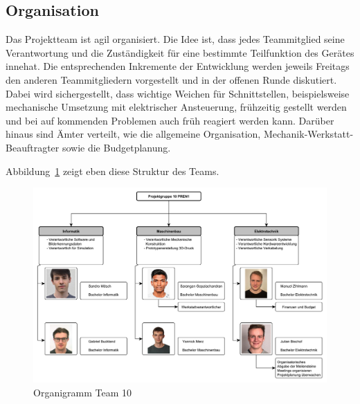 \documentclass[main.tex]{subfiles} %
\begin{document}

\subsection{Organisation}

Das Projektteam ist agil organisiert. Die Idee ist, dass jedes Teammitglied
seine Verantwortung und die Zuständigkeit für eine bestimmte Teilfunktion des
Gerätes innehat. Die entsprechenden Inkremente der Entwicklung werden jeweils
Freitags den anderen Teammitgliedern vorgestellt und in der offenen Runde
diskutiert. Dabei wird sichergestellt, dass wichtige Weichen für
Schnittstellen, beispielsweise mechanische Umsetzung mit elektrischer
Ansteuerung, frühzeitig gestellt werden und bei auf kommenden Problemen auch
früh reagiert werden kann. Darüber hinaus sind Ämter verteilt, wie die
allgemeine Organisation, Mechanik-Werkstatt-Beauftragter sowie die
Budgetplanung.

Abbildung~\ref{fig:Organigramm} zeigt eben diese Struktur des Teams.

\begin{figure}[h!]
    \centering
    \includegraphics[page=1, width=1\textwidth]{./fig_Projektmanagement/Organigramm.pdf}
    \caption{Organigramm Team 10}\label{fig:Organigramm}
\end{figure}
\end{document}
